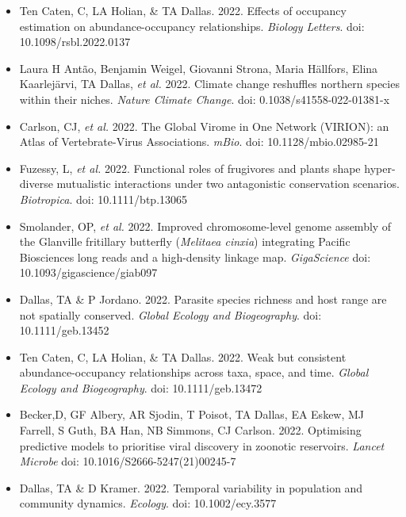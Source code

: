 \documentclass[]{CV}
\begin{document}
\begin{itemize}

\item Ten Caten, C, LA Holian, \& {\mefont TA Dallas}. 2022. Effects of occupancy estimation on abundance-occupancy relationships. \textit{Biology Letters}. doi: 10.1098/rsbl.2022.0137

\item Laura H Antão, Benjamin Weigel, Giovanni Strona, Maria Hällfors, Elina Kaarlejärvi, {\mefont TA Dallas}, \textit{et al.} 2022. Climate change reshuffles northern species within their niches. \textit{Nature Climate Change}. doi: 0.1038/s41558-022-01381-x

\item Carlson, CJ, \textit{et al.} 2022. The Global Virome in One Network (VIRION): an Atlas of Vertebrate-Virus Associations. \textit{mBio}. doi: 10.1128/mbio.02985-21

\item Fuzessy, L, \textit{et al.} 2022. Functional roles of frugivores and plants shape hyper-diverse mutualistic interactions under two antagonistic conservation scenarios. \textit{Biotropica}. doi: 10.1111/btp.13065

\item Smolander, OP, \textit{et al.} 2022. Improved chromosome-level genome assembly of the Glanville fritillary butterfly (\textit{Melitaea cinxia}) integrating Pacific Biosciences long reads and a high-density linkage map. \textit{GigaScience} doi: 10.1093/gigascience/giab097

\item {\mefont Dallas, TA} \& P Jordano. 2022. Parasite species richness and host range are not spatially conserved. \textit{Global Ecology and Biogeography}. doi: 10.1111/geb.13452

\item Ten Caten, C, LA Holian, \& {\mefont TA Dallas}. 2022. Weak but consistent abundance-occupancy relationships across taxa, space, and time. \textit{Global Ecology and Biogeography}. doi: 10.1111/geb.13472

\item Becker,D, GF Albery, AR Sjodin, T Poisot, {\mefont TA Dallas}, EA Eskew, MJ Farrell, S Guth, BA Han, NB Simmons, CJ Carlson. 2022. Optimising predictive models to prioritise viral discovery in
zoonotic reservoirs. \textit{Lancet Microbe} doi: 10.1016/S2666-5247(21)00245-7

\item {\mefont Dallas, TA} \& D Kramer. 2022. Temporal variability in population and community dynamics. \textit{Ecology}. doi: 10.1002/ecy.3577


\end{itemize}
\end{document}
